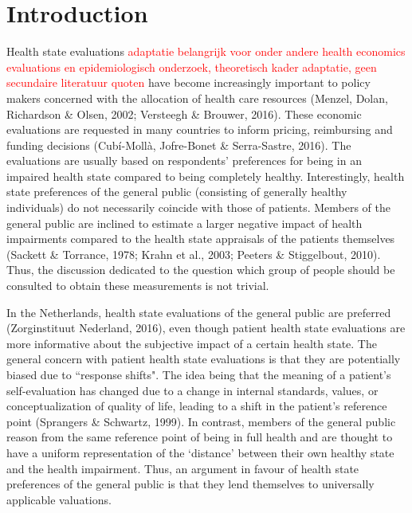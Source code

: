 \documentclass[12pt]{article}
\begin{document}

\section{Introduction}

Health state evaluations \textcolor{red}{adaptatie belangrijk voor onder andere health economics evaluations en epidemiologisch onderzoek, theoretisch kader adaptatie, geen secundaire literatuur quoten} have become increasingly important to policy makers concerned with the allocation of health care resources (Menzel, Dolan, Richardson \& Olsen, 2002; Versteegh \& Brouwer, 2016). These economic evaluations are requested in many countries to inform pricing, reimbursing and funding decisions (Cub\'i-Moll\`a, Jofre-Bonet \& Serra-Sastre, 2016). The evaluations are usually based on respondents' preferences for being in an impaired health state compared to being completely healthy. Interestingly, health state preferences of the general public (consisting of generally healthy individuals) do not necessarily coincide with those of patients. Members of the general public are inclined to estimate a larger negative impact of health impairments compared to the health state appraisals of the patients themselves (Sackett \& Torrance, 1978; Krahn et al., 2003; Peeters \& Stiggelbout, 2010). Thus, the discussion dedicated to the question which group of people should be consulted to obtain these measurements is not trivial. %

In the Netherlands, health state evaluations of the general public are preferred (Zorginstituut Nederland, 2016), even though patient health state evaluations are more informative about the subjective impact of a certain health state. The general concern with patient health state evaluations is that they are potentially biased due to ``response shifts". The idea being that the meaning of a patient's self-evaluation has changed due to a change in internal standards, values, or conceptualization of quality of life, leading to a shift in the patient's reference point (Sprangers \& Schwartz, 1999). In contrast, members of the general public reason from the same reference point of being in full health and are thought to have a uniform representation of the `distance' between their own healthy state and the health impairment. Thus, an argument in favour of health state preferences of the general public is that they lend themselves to universally applicable valuations.
\end{document}
